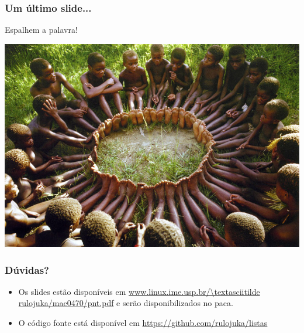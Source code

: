 \documentclass[serif,mathserif]{beamer}
\begin{document}
\begin{frame}
  \frametitle{Um último slide...}
  Espalhem a palavra!\\
  \begin{center}
  \includegraphics[scale=0.5]{hsubuntuarewe2.jpg}
  \end{center}

\end{frame}

\begin{frame}
  \frametitle{Dúvidas?}
  \begin{itemize}
    \item Os slides estão disponíveis em \url{www.linux.ime.usp.br/\textasciitilde rulojuka/mac0470/pnt.pdf} e serão disponibilizados no paca.\\
    \item O código fonte está disponível em \url{https://github.com/rulojuka/listas}
  \end{itemize}
\end{frame}
\end{document}
